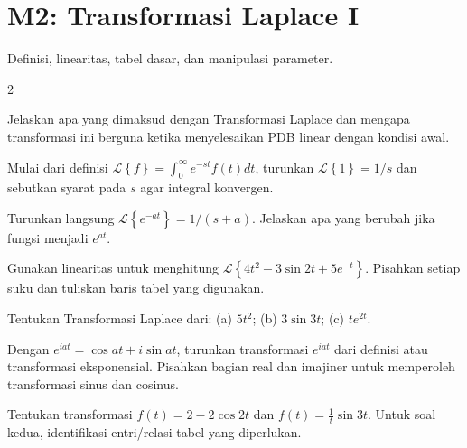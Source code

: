 \documentclass[10pt,a4paper]{article}
\newcommand{\level}[1]{\colorbox{levelbg}{\scriptsize\strut #1}}
\newcommand{\src}[1]{\colorbox{sourcebg}{\scriptsize\strut #1}}
\newcommand{\Lap}[1]{\mathcal{L}\left\{#1\right\}}
\begin{document}
\section*{M2: Transformasi Laplace I}
{\color{iteraGray}\small Definisi, linearitas, tabel dasar, dan manipulasi parameter.}\par\vspace{1mm}
\begin{multicols}{2}
\begin{qbox}[title={M2.1: Makna Transformasi Laplace\hfill \level{L1}\;\src{PR}}]
\small Jelaskan apa yang dimaksud dengan Transformasi Laplace dan mengapa transformasi ini berguna ketika menyelesaikan PDB linear dengan kondisi awal.
\end{qbox}
\begin{qbox}[title={M2.2: Dari definisi: fungsi konstanta\hfill \level{L2}\;\src{Boas}}]
\small Mulai dari definisi $\Lap{f}=\int_0^\infty e^{-st}f(t)dt$, turunkan $\Lap{1}=1/s$ dan sebutkan syarat pada $s$ agar integral konvergen.
\end{qbox}
\begin{qbox}[title={M2.3: Dari definisi: eksponensial\hfill \level{L2}\;\src{Boas}}]
\small Turunkan langsung $\Lap{e^{-at}}=1/(s+a)$. Jelaskan apa yang berubah jika fungsi menjadi $e^{at}$.
\end{qbox}
\begin{qbox}[title={M2.4: Linearitas\hfill \level{L2}\;\src{Var}}]
\small Gunakan linearitas untuk menghitung $\Lap{4t^2-3\sin 2t+5e^{-t}}$. Pisahkan setiap suku dan tuliskan baris tabel yang digunakan.
\end{qbox}
\begin{qbox}[title={M2.5: Tugas resmi: transformasi dasar\hfill \level{L2}\;\src{PR}}]
\small Tentukan Transformasi Laplace dari: (a) $5t^2$; (b) $3\sin 3t$; (c) $te^{2t}$.
\end{qbox}
\begin{qbox}[title={M2.6: Eksponensial kompleks\hfill \level{L3}\;\src{PR}}]
\small Dengan $e^{iat}=\cos at+i\sin at$, turunkan transformasi $e^{iat}$ dari definisi atau transformasi eksponensial. Pisahkan bagian real dan imajiner untuk memperoleh transformasi sinus dan cosinus.
\end{qbox}
\begin{qbox}[title={M2.7: Kombinasi trigonometrik\hfill \level{L2}\;\src{PR}}]
\small Tentukan transformasi $f(t)=2-2\cos 2t$ dan $f(t)=\frac1t\sin 3t$. Untuk soal kedua, identifikasi entri/relasi tabel yang diperlukan.
\end{qbox}

\end{multicols}
\end{document}
